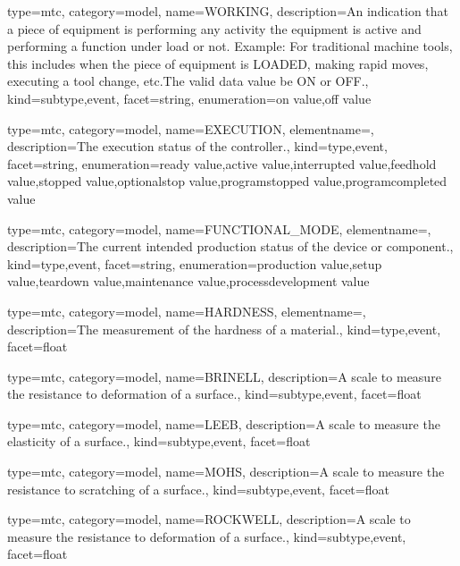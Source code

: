 {
  type=mtc,
  category=model,
  name={WORKING},
  description={An indication that a piece of equipment is performing any activity  the equipment is active and performing a function under load or not. \newline Example: For traditional machine tools, this includes when the piece of equipment is LOADED, making rapid moves, executing a tool change, etc.The \gls{valid data value} \must be ON or OFF.},
  kind={subtype,event},
  facet={\gls{string}},
  enumeration={\gls{on value},\gls{off value}}
}


{
  type=mtc,
  category=model,
  name={EXECUTION},
  elementname=,
  description={The execution status of the \gls{controller}.},
  kind={type,event},
  facet={\gls{string}},
  enumeration={\gls{ready value},\gls{active value},\gls{interrupted value},\gls{feedhold value},\gls{stopped value},\gls{optionalstop value},\gls{programstopped value},\gls{programcompleted value}}
}


{
  type=mtc,
  category=model,
  name={FUNCTIONAL\_MODE},
  elementname=,
  description={The current intended production status of the device or component.},
  kind={type,event},
  facet={\gls{string}},
  enumeration={\gls{production value},\gls{setup value},\gls{teardown value},\gls{maintenance value},\gls{processdevelopment value}}
}


{
  type=mtc,
  category=model,
  name={HARDNESS},
  elementname=,
  description={The measurement of the hardness of a material.},
  kind={type,event},
  facet={\gls{float}}
}


{
  type=mtc,
  category=model,
  name={BRINELL},
  description={A scale to measure the resistance to deformation of a surface.},
  kind={subtype,event},
  facet={\gls{float}}
}


{
  type=mtc,
  category=model,
  name={LEEB},
  description={A scale to measure the elasticity of a surface.},
  kind={subtype,event},
  facet={\gls{float}}
}


{
  type=mtc,
  category=model,
  name={MOHS},
  description={A scale to measure the resistance to scratching of a surface.},
  kind={subtype,event},
  facet={\gls{float}}
}


{
  type=mtc,
  category=model,
  name={ROCKWELL},
  description={A scale to measure the resistance to deformation of a surface.},
  kind={subtype,event},
  facet={\gls{float}}
}


